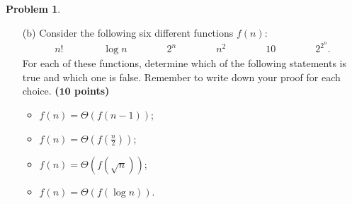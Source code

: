 \documentclass{article}
\theoremstyle{definition}
\newtheorem{problem}{Problem}
\def\fline{\rule{0.75\linewidth}{0.5pt}}
\newcommand{\finishline}{\begin{center}\fline\end{center}}
\newtheorem*{solution*}{Solution}
\newenvironment{solution}{\begin{solution*}}{{\finishline} \end{solution*}}
\newcommand{\grade}[1]{\hfill{\textbf{($\mathbf{#1}$ points)}}}
\begin{document}
\begin{problem}
\begin{enumerate}
\begin{solution}

\end{solution}
	
	\item[(b)]  Consider the following six different functions $f(n)$: 
	  \begin{align*}
	    n! \qquad\qquad  \log n \qquad\qquad  2^{n}\qquad\qquad n^{2}\qquad\qquad 10 \qquad\qquad  2^{2^{n}}.
	  \end{align*} 
	 For each of these functions, determine which of the following statements is true and which one is false. Remember to write down your proof for each choice.    \grade{10} 
	\begin{itemize}
        \item $f(n) = \Theta(f(n-1))$;
        \item $f(n) = \Theta(f())$;
        \item $f(n) = \Theta(f(\sqrt n))$;
        \item $f(n) = \Theta(f(\log n))$.
    \end{itemize}
    

\end{enumerate}
\end{problem}
\end{document}
